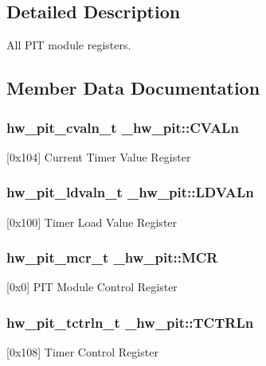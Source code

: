 \subsection{Detailed Description}
All P\+IT module registers. 

\subsection{Member Data Documentation}
\subsubsection[{\texorpdfstring{C\+V\+A\+Ln}{CVALn}}]{ {\bf hw\+\_\+pit\+\_\+cvaln\+\_\+t} \+\_\+hw\+\_\+pit\+::\+C\+V\+A\+Ln}\hypertarget{struct__hw__pit_a9b0880684600e18e71a009df99fac13c}{}\label{struct__hw__pit_a9b0880684600e18e71a009df99fac13c}
\mbox{[}0x104\mbox{]} Current Timer Value Register 
\subsubsection[{\texorpdfstring{L\+D\+V\+A\+Ln}{LDVALn}}]{ {\bf hw\+\_\+pit\+\_\+ldvaln\+\_\+t} \+\_\+hw\+\_\+pit\+::\+L\+D\+V\+A\+Ln}\hypertarget{struct__hw__pit_aec4b30897f0e80f660ad105f7ce33d5c}{}\label{struct__hw__pit_aec4b30897f0e80f660ad105f7ce33d5c}
\mbox{[}0x100\mbox{]} Timer Load Value Register 
\subsubsection[{\texorpdfstring{M\+CR}{MCR}}]{ {\bf hw\+\_\+pit\+\_\+mcr\+\_\+t} \+\_\+hw\+\_\+pit\+::\+M\+CR}\hypertarget{struct__hw__pit_a38c7cbae6c7902108ce6d7c356b65d19}{}\label{struct__hw__pit_a38c7cbae6c7902108ce6d7c356b65d19}
\mbox{[}0x0\mbox{]} P\+IT Module Control Register 
\subsubsection[{\texorpdfstring{T\+C\+T\+R\+Ln}{TCTRLn}}]{ {\bf hw\+\_\+pit\+\_\+tctrln\+\_\+t} \+\_\+hw\+\_\+pit\+::\+T\+C\+T\+R\+Ln}\hypertarget{struct__hw__pit_ab4be36541eebdc01d57596afbe548045}{}\label{struct__hw__pit_ab4be36541eebdc01d57596afbe548045}
\mbox{[}0x108\mbox{]} Timer Control Register 
